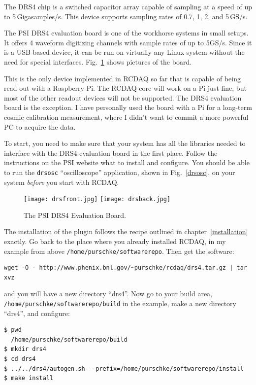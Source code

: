 \documentclass{article}[11pt]
\begin{document}
The DRS4 chip is a switched capacitor array capable of sampling at a
speed of up to 5\,Gigasamples/s. This device supports sampling rates
of 0.7, 1, 2, and 5\,GS/s. 

The PSI DRS4 evaluation board is one of the workhorse systems in small
setups. It offers 4 waveform digitizing channels with sample rates of
up to 5GS/s. Since it is a USB-based device, it can be run on
virtually any Linux system without the need for special
interfaces. Fig.~\ref{drsevalboard} shows pictures of the board.

This is the only device implemented in RCDAQ so far that is capable of
being read out with a Raspberry Pi. The RCDAQ core will work on a Pi
just fine, but most of the other readout devices will not be
supported. The DRS4 evaluation board is the exception. I have
personally used the board with a Pi for a long-term cosmic calibration
measurement, where I didn't want to commit a more powerful PC to
acquire the data.

To start, you need to make sure that your system has all the libraries
needed to interface with the DRS4 evaluation board in the first
place. Follow the instructions on the PSI website what to install and
configure.  You should be able to run the \verb|drsosc|
``oscilloscope'' application, shown in Fig.~\ref{drsosc}, on your
system \emph{before} you start with RCDAQ.

\begin{figure}
  \centering
  \texttt{[image: drsfront.jpg]}
  \texttt{[image: drsback.jpg]}
  \caption{\label{drsevalboard}The PSI DRS4 Evaluation Board.}
\end{figure}

The installation of the plugin follows the recipe outlined in
chapter~\ref{installation} exactly. Go back to the place where you
already installed RCDAQ, in my example from above
\verb|/home/purschke/softwarerepo|. Then get the software:

\begin{verbatim}
wget -O - http://www.phenix.bnl.gov/~purschke/rcdaq/drs4.tar.gz | tar xvz
\end{verbatim}

and you will have a new directory ``drs4''. Now go to your build area,
\verb|/home/purschke/softwarerepo/build| in the example, make a new directory ``drs4'',
and configure:

\begin{verbatim} 
$ pwd 
  /home/purschke/softwarerepo/build 
$ mkdir drs4 
$ cd drs4 
$ ../../drs4/autogen.sh --prefix=/home/purschke/softwarerepo/install 
$ make install
\end{verbatim}
\end{document}
